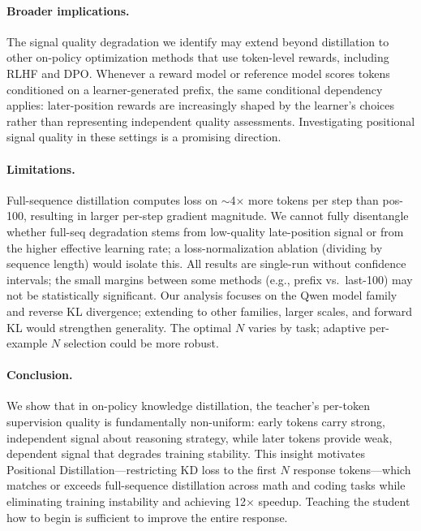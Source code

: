 \documentclass[10pt]{article}
\newcommand{\methodfull}{Positional Distillation}
\begin{document}
\paragraph{Broader implications.} The signal quality degradation we identify may extend beyond distillation to other on-policy optimization methods that use token-level rewards, including RLHF and DPO. Whenever a reward model or reference model scores tokens conditioned on a learner-generated prefix, the same conditional dependency applies: later-position rewards are increasingly shaped by the learner's choices rather than representing independent quality assessments. Investigating positional signal quality in these settings is a promising direction.

\paragraph{Limitations.} Full-sequence distillation computes loss on ${\sim}$4$\times$ more tokens per step than pos-100, resulting in larger per-step gradient magnitude. We cannot fully disentangle whether full-seq degradation stems from low-quality late-position signal or from the higher effective learning rate; a loss-normalization ablation (dividing by sequence length) would isolate this. All results are single-run without confidence intervals; the small margins between some methods (e.g., prefix vs.\ last-100) may not be statistically significant. Our analysis focuses on the Qwen model family and reverse KL divergence; extending to other families, larger scales, and forward KL would strengthen generality. The optimal $N$ varies by task; adaptive per-example $N$ selection could be more robust.

\paragraph{Conclusion.} We show that in on-policy knowledge distillation, the teacher's per-token supervision quality is fundamentally non-uniform: early tokens carry strong, independent signal about reasoning strategy, while later tokens provide weak, dependent signal that degrades training stability. This insight motivates \methodfull{}---restricting KD loss to the first $N$ response tokens---which matches or exceeds full-sequence distillation across math and coding tasks while eliminating training instability and achieving 12$\times$ speedup. Teaching the student how to begin is sufficient to improve the entire response.
\end{document}
